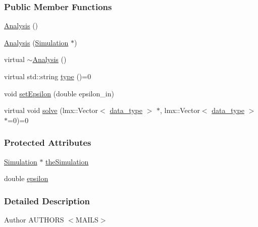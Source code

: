 \subsubsection*{Public Member Functions}
\begin{DoxyCompactItemize}
\item 
\hyperlink{classmknix_1_1_analysis_a524d9cd12f302975c64a0c4266cd91ed}{Analysis} ()
\item 
\hyperlink{classmknix_1_1_analysis_a58f5b79c2b28457ae18186991306abb3}{Analysis} (\hyperlink{classmknix_1_1_simulation}{Simulation} $\ast$)
\item 
virtual \hyperlink{classmknix_1_1_analysis_a4813618a04dd0c3098a58b60792f2e34}{$\sim$\-Analysis} ()
\item 
virtual std\-::string \hyperlink{classmknix_1_1_analysis_a6dd7026a22ae11f3eef3dad3be370e70}{type} ()=0
\item 
void \hyperlink{classmknix_1_1_analysis_a4e6baab7f63725b4ed816bb3bdbdc1d8}{set\-Epsilon} (double epsilon\-\_\-in)
\item 
virtual void \hyperlink{classmknix_1_1_analysis_a2a02ee6ab0728bc1ab5e6aab010afe87}{solve} (lmx\-::\-Vector$<$ \hyperlink{namespacemknix_a16be4b246fbf2cceb141e3a179111020}{data\-\_\-type} $>$ $\ast$, lmx\-::\-Vector$<$ \hyperlink{namespacemknix_a16be4b246fbf2cceb141e3a179111020}{data\-\_\-type} $>$ $\ast$=0)=0
\end{DoxyCompactItemize}
\subsubsection*{Protected Attributes}
\begin{DoxyCompactItemize}
\item 
\hyperlink{classmknix_1_1_simulation}{Simulation} $\ast$ \hyperlink{classmknix_1_1_analysis_a1abc29e3b8565590b6bf0ce2d8b3b68f}{the\-Simulation}
\item 
double \hyperlink{classmknix_1_1_analysis_a7e0439caf5fa5f90d808acec6d75b72f}{epsilon}
\end{DoxyCompactItemize}


\subsubsection{Detailed Description}
\begin{DoxyAuthor}{Author}
A\-U\-T\-H\-O\-R\-S $<$\-M\-A\-I\-L\-S$>$ 
\end{DoxyAuthor}


